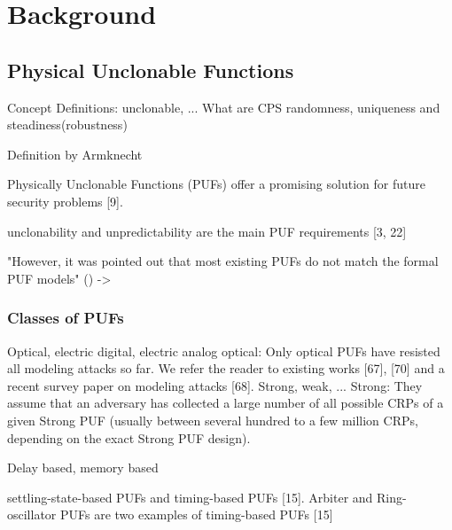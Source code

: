\chapter{Background}

\section{Physical Unclonable Functions}
\label{sec:pyhsicalunclonablefunctions}

Concept \cite{Suh2007PhysicalGeneration}
Definitions: unclonable, ...
What are CPS
randomness, uniqueness and steadiness(robustness) \cite{CherifJouini2011PerformanceStatistics}

Definition by Armknecht

Physically Unclonable Functions (PUFs) offer a promising solution for future security problems [9].
\cite{Tajik2014PhysicalPUFs}

unclonability and unpredictability are the main PUF requirements [3, 22]
\cite{Tajik2014PhysicalPUFs}

"However, it was pointed out that most existing PUFs do not match the formal PUF models" (\cite{Becker2015ThePUFs}) -> \cite{Ruhrmair2013PUFsEvaluations}


\subsection{Classes of PUFs}

Optical, electric digital, electric analog
optical: Only optical PUFs have resisted all modeling attacks so far. We refer the reader to existing works [67], [70] and a recent survey paper on modeling attacks [68]. \cite{Ruhrmair2014PUFsGlance}
Strong, weak, ...  
Strong: They assume that an adversary has collected a large number of all possible CRPs of a given Strong PUF (usually between several hundred to a few million CRPs, depending on the exact Strong PUF design). \cite{Ruhrmair2014PUFsGlance}

Delay based, memory based 

settling-state-based PUFs and timing-based PUFs [15].
Arbiter and Ring-oscillator PUFs are two examples of timing-based PUFs [15]
\cite{Tajik2014PhysicalPUFs}

